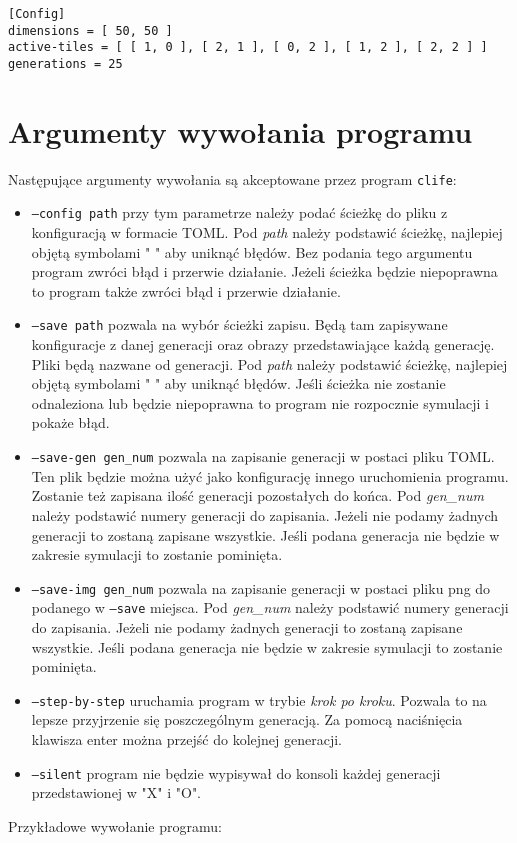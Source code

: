 \documentclass[12pt]{article}
\begin{document}
\begin{verbatim}
[Config]
dimensions = [ 50, 50 ]
active-tiles = [ [ 1, 0 ], [ 2, 1 ], [ 0, 2 ], [ 1, 2 ], [ 2, 2 ] ]
generations = 25
\end{verbatim}

\section{Argumenty wywołania programu}

Następujące argumenty wywołania są akceptowane przez program \texttt{clife}:

\begin{itemize}

\item
\texttt{--config path} przy tym parametrze należy podać ścieżkę do pliku z konfiguracją w formacie TOML.
Pod \textit{path} należy podstawić ścieżkę, najlepiej objętą symbolami " " aby uniknąć błędów.
Bez podania tego argumentu program zwróci błąd i przerwie działanie.
Jeżeli ścieżka będzie niepoprawna to program także zwróci błąd i przerwie działanie.

\item
\texttt{--save path} pozwala na wybór ścieżki zapisu.
Będą tam zapisywane konfiguracje z danej generacji oraz obrazy przedstawiające każdą generację.
Pliki będą nazwane od generacji.
Pod \textit{path} należy podstawić ścieżkę, najlepiej objętą symbolami " " aby uniknąć błędów.
Jeśli ścieżka nie zostanie odnaleziona lub będzie niepoprawna to program nie rozpocznie symulacji i pokaże błąd.

\item
\texttt{--save-gen gen\_num} pozwala na zapisanie generacji w postaci pliku TOML.
Ten plik będzie można użyć jako konfigurację innego uruchomienia programu.
Zostanie też zapisana ilość generacji pozostałych do końca.
Pod \textit{gen\_num} należy podstawić numery generacji do zapisania.
Jeżeli nie podamy żadnych generacji to zostaną zapisane wszystkie.
Jeśli podana generacja nie będzie w zakresie symulacji to zostanie pominięta.

\item
\texttt{--save-img gen\_num} pozwala na zapisanie generacji w postaci pliku png do podanego w \texttt{--save} miejsca.
Pod \textit{gen\_num} należy podstawić numery generacji do zapisania.
Jeżeli nie podamy żadnych generacji to zostaną zapisane wszystkie.
Jeśli podana generacja nie będzie w zakresie symulacji to zostanie pominięta.

\item
\texttt{--step-by-step} uruchamia program w trybie \textit{krok po kroku}.
Pozwala to na lepsze przyjrzenie się poszczególnym generacją.
Za pomocą naciśnięcia klawisza enter można przejść do kolejnej generacji.

\item
\texttt{--silent} program nie będzie wypisywał do konsoli każdej generacji przedstawionej w "X" i "O".
\end{itemize}
Przykładowe wywołanie programu:
\end{document}
